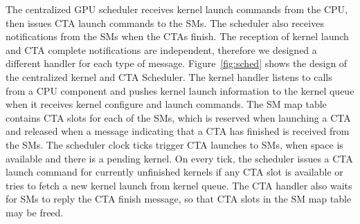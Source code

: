 The centralized GPU scheduler receives kernel launch commands from the CPU, then
issues CTA launch commands to the SMs. The scheduler also receives notifications
from the SMs when the CTAs finish. The reception of kernel launch and CTA
complete notifications are independent, therefore we designed a different
handler for each type of message. Figure~\ref{fig:sched} shows the design of the
centralized kernel and CTA Scheduler. The kernel handler listens to calls from a
CPU component and pushes kernel launch information to the kernel queue when it
receives kernel configure and launch commands. The SM map table contains CTA
slots for each of the SMs, which is reserved when launching a CTA and released when a
message indicating that a CTA has finished is received from the SMs. The
scheduler clock ticks trigger CTA launches to SMs, when space is available and
there is a pending kernel. On every tick, the scheduler issues a CTA launch
command for currently unfinished kernels if any CTA slot is available or tries
to fetch a new kernel launch from kernel queue. The CTA handler also waits for
SMs to reply the CTA finish message, so that CTA slots in the SM map table may
be freed.
